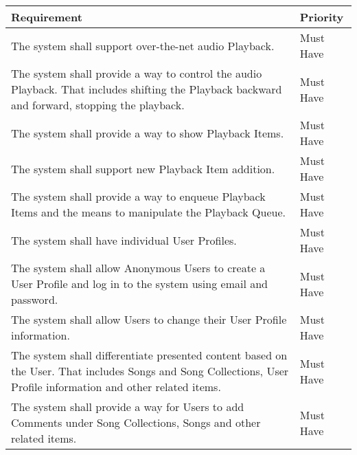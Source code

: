 \begin{table}[h!]
    \centering
    \begin{tabular}{|p{12cm}|p{3cm}|}
        \hline
        \textbf{Requirement}                                                                                                                                            & \textbf{Priority} \\
        \hline
        The system shall support over-the-net audio Playback.                                                                                                           & Must Have         \\
        \hline
        The system shall provide a way to control the audio Playback. That includes shifting the Playback backward and forward, stopping the playback. & Must Have \\
        \hline
        The system shall provide a way to show Playback Items.                                                                                                          & Must Have         \\
        \hline
        The system shall support new Playback Item addition.                                                                                                            & Must Have         \\
        \hline
        The system shall provide a way to enqueue Playback Items and the means to manipulate the Playback Queue. & Must Have \\
        \hline
        The system shall have individual User Profiles.                                                                                                                 & Must Have         \\
        \hline
        The system shall allow Anonymous Users to create a User Profile and log in to the system using email and password. & Must Have \\
        \hline
        The system shall allow Users to change their User Profile information.                                                                                          & Must Have         \\
        \hline
        The system shall differentiate presented content based on the User. That includes Songs and Song Collections, User Profile information and other related items. & Must Have \\
        \hline
        The system shall provide a way for Users to add Comments under Song Collections, Songs and other related items. & Must Have \\

\end{tabular}
\end{table}
